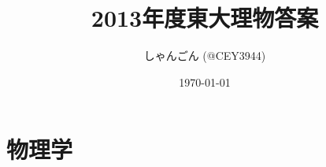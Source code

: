 \documentclass[11pt,dvipdfmx,a4paper]{jsreport}
\title{2013年度東大理物答案}
\author{しゃんごん (@CEY3944)}
\date{\today}
\numberwithin{equation}{subsection} %
\begin{document}

\maketitle

\clearpage
\chapter*{物理学}

\clearpage

\clearpage

\clearpage

\clearpage

% 
\end{document}
